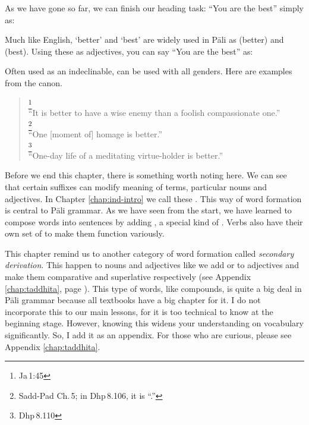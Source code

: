 As we have gone so far, we can finish our heading task: ``You are the best'' simply as:


Much like English, `better' and `best' are widely used in P\=ali as  (better) and  (best). Using these as adjectives, you can say ``You are the best'' as:


Often used as an indeclinable,  can be used with all genders. Here are examples from the canon.

\begin{quote}
\footnote{Ja\,1:45} \\
``It is better to have a wise enemy than a foolish compassionate one.''\\[1.5mm]
%
\footnote{Sadd-Pad Ch.\,5; in Dhp\,8.106, it is ``.''} \\
``One [moment of] homage is better.''\\[1.5mm]
%
\footnote{Dhp\,8.110} \\
``One-day life of a meditating virtue-holder is better.''
\end{quote}

Before we end this chapter, there is something worth noting here. We can see that certain suffixes can modify meaning of terms, particular nouns and adjectives. In Chapter \ref{chap:ind-intro} we call these . This way of word formation is central to P\=ali grammar. As we have seen from the start, we have learned to compose words into sentences by adding , a special kind of . Verbs also have their own set of  to make them function variously.

This chapter remind us to another category of word formation called \emph{secondary derivation}. This happen to nouns and adjectives like we add  or  to adjectives and make them comparative and superlative respectively (see Appendix \ref{chap:taddhita}, page \pageref{par:visesataddhita}). This type of words, like compounds, is quite a big deal in P\=ali grammar because all textbooks have a big chapter for it. I do not incorporate this to our main lessons, for it is too technical to know at the beginning stage. However, knowing this widens your understanding on vocabulary significantly. So, I add it as an appendix. For those who are curious, please see Appendix \ref{chap:taddhita}.

